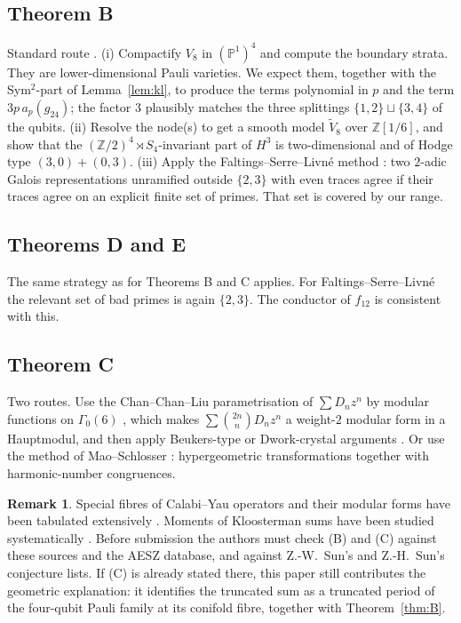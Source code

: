 \documentclass[11pt]{amsart}
\theoremstyle{definition}
\newtheorem{remark}[theorem]{Remark}
\newcommand{\Z}{\mathbb{Z}}
\newcommand{\PP}{\mathbb{P}}
\begin{document}
\subsection*{Theorem B}
Standard route \cite{Meyer,HSGS}. (i) Compactify $V_8$ in $(\PP^1)^4$ and compute the boundary strata. They are lower-dimensional Pauli varieties. We expect them, together with the Sym$^2$-part of Lemma~\ref{lem:kl}, to produce the terms polynomial in $p$ and the term $3p\,a_p(g_{24})$; the factor $3$ plausibly matches the three splittings $\{1,2\}\sqcup\{3,4\}$ of the qubits. (ii) Resolve the node(s) to get a smooth model $\widetilde V_8$ over $\Z[1/6]$, and show that the $(\Z/2)^4\rtimes S_4$-invariant part of $H^3$ is two-dimensional and of Hodge type $(3,0)+(0,3)$. (iii) Apply the Faltings--Serre--Livn\'e method \cite{Livne}: two $2$-adic Galois representations unramified outside $\{2,3\}$ with even traces agree if their traces agree on an explicit finite set of primes. That set is covered by our range.

\subsection*{Theorems D and E}
The same strategy as for Theorems B and C applies. For Faltings--Serre--Livn\'e the relevant set of bad primes is again $\{2,3\}$. The conductor of $f_{12}$ is consistent with this.

\subsection*{Theorem C}
Two routes. Use the Chan--Chan--Liu parametrisation of $\sum D_n z^n$ by modular functions on $\Gamma_0(6)$ \cite{CCL}, which makes $\sum\binom{2n}{n}D_nz^n$ a weight-$2$ modular form in a Hauptmodul, and then apply Beukers-type or Dwork-crystal arguments \cite{BV}. Or use the method of Mao--Schlosser \cite{MS}: hypergeometric transformations together with harmonic-number congruences.

\begin{remark}\label{rem:priority}
Special fibres of Calabi--Yau operators and their modular forms have been tabulated extensively \cite{AESZ,Meyer}. Moments of Kloosterman sums have been studied systematically \cite{Livne,PTV,HSGS,Yun,FSY}. Before submission the authors must check (B) and (C) against these sources and the AESZ database, and against Z.-W.~Sun's and Z.-H.~Sun's conjecture lists. If (C) is already stated there, this paper still contributes the geometric explanation: it identifies the truncated sum as a truncated period of the four-qubit Pauli family at its conifold fibre, together with Theorem~\ref{thm:B}.
\end{remark}
\end{document}
